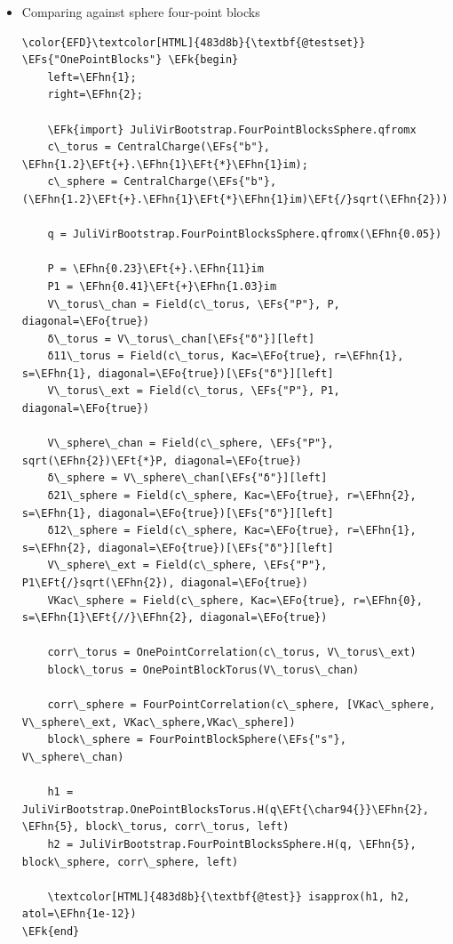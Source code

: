 \documentclass[a4paper]{article}
\numberwithin{equation}{section}
\newcommand{\EFs}[1]{\textcolor{EFs}{#1}} %
\newcommand{\EFk}[1]{\textcolor{EFk}{#1}} %
\newcommand{\EFt}[1]{\textcolor{EFt}{#1}} %
\newcommand{\EFo}[1]{\textcolor{EFo}{#1}} %
\newcommand{\EFhn}[1]{\textcolor{EFhn}{#1}} %
\begin{document}
\begin{itemize}
\item Comparing against sphere four-point blocks
\label{sec:orge69019e}

\begin{Code}
\begin{Verbatim}
\color{EFD}\textcolor[HTML]{483d8b}{\textbf{@testset}} \EFs{"OnePointBlocks"} \EFk{begin}
    left=\EFhn{1};
    right=\EFhn{2};

    \EFk{import} JuliVirBootstrap.FourPointBlocksSphere.qfromx
    c\_torus = CentralCharge(\EFs{"b"}, \EFhn{1.2}\EFt{+}.\EFhn{1}\EFt{*}\EFhn{1}im);
    c\_sphere = CentralCharge(\EFs{"b"}, (\EFhn{1.2}\EFt{+}.\EFhn{1}\EFt{*}\EFhn{1}im)\EFt{/}sqrt(\EFhn{2}))

    q = JuliVirBootstrap.FourPointBlocksSphere.qfromx(\EFhn{0.05})

    P = \EFhn{0.23}\EFt{+}.\EFhn{11}im
    P1 = \EFhn{0.41}\EFt{+}\EFhn{1.03}im
    V\_torus\_chan = Field(c\_torus, \EFs{"P"}, P, diagonal=\EFo{true})
    δ\_torus = V\_torus\_chan[\EFs{"δ"}][left]
    δ11\_torus = Field(c\_torus, Kac=\EFo{true}, r=\EFhn{1}, s=\EFhn{1}, diagonal=\EFo{true})[\EFs{"δ"}][left]
    V\_torus\_ext = Field(c\_torus, \EFs{"P"}, P1, diagonal=\EFo{true})

    V\_sphere\_chan = Field(c\_sphere, \EFs{"P"}, sqrt(\EFhn{2})\EFt{*}P, diagonal=\EFo{true})
    δ\_sphere = V\_sphere\_chan[\EFs{"δ"}][left]
    δ21\_sphere = Field(c\_sphere, Kac=\EFo{true}, r=\EFhn{2}, s=\EFhn{1}, diagonal=\EFo{true})[\EFs{"δ"}][left]
    δ12\_sphere = Field(c\_sphere, Kac=\EFo{true}, r=\EFhn{1}, s=\EFhn{2}, diagonal=\EFo{true})[\EFs{"δ"}][left]
    V\_sphere\_ext = Field(c\_sphere, \EFs{"P"}, P1\EFt{/}sqrt(\EFhn{2}), diagonal=\EFo{true})
    VKac\_sphere = Field(c\_sphere, Kac=\EFo{true}, r=\EFhn{0}, s=\EFhn{1}\EFt{//}\EFhn{2}, diagonal=\EFo{true})

    corr\_torus = OnePointCorrelation(c\_torus, V\_torus\_ext)
    block\_torus = OnePointBlockTorus(V\_torus\_chan)

    corr\_sphere = FourPointCorrelation(c\_sphere, [VKac\_sphere, V\_sphere\_ext, VKac\_sphere,VKac\_sphere])
    block\_sphere = FourPointBlockSphere(\EFs{"s"}, V\_sphere\_chan)

    h1 = JuliVirBootstrap.OnePointBlocksTorus.H(q\EFt{\char94{}}\EFhn{2}, \EFhn{5}, block\_torus, corr\_torus, left)
    h2 = JuliVirBootstrap.FourPointBlocksSphere.H(q, \EFhn{5}, block\_sphere, corr\_sphere, left)

    \textcolor[HTML]{483d8b}{\textbf{@test}} isapprox(h1, h2, atol=\EFhn{1e-12})
\EFk{end}
\end{Verbatim}
\end{Code}
\end{itemize}
\end{document}
